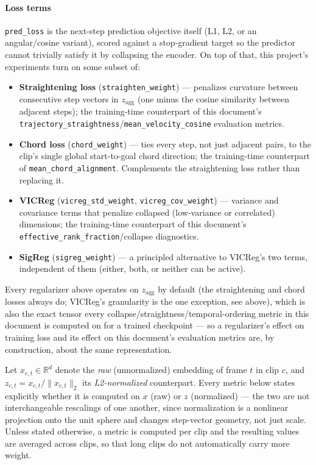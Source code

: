 \paragraph{Loss terms} \texttt{pred\_loss} is the next-step prediction objective itself
(L1, L2, or an angular/cosine variant), scored against a stop-gradient target so the
predictor cannot trivially satisfy it by collapsing the encoder. On top of that, this
project's experiments turn on some subset of:
\begin{itemize}
    \item \textbf{Straightening loss} (\texttt{straighten\_weight}) --- penalizes
    curvature between consecutive step vectors in $z_{\mathrm{agg}}$ (one minus the
    cosine similarity between adjacent steps); the training-time counterpart of this
    document's \texttt{trajectory\_straightness}/\texttt{mean\_velocity\_cosine}
    evaluation metrics.
    \item \textbf{Chord loss} (\texttt{chord\_weight}) --- ties every step, not just
    adjacent pairs, to the clip's single global start-to-goal chord direction; the
    training-time counterpart of \texttt{mean\_chord\_alignment}. Complements the
    straightening loss rather than replacing it.
    \item \textbf{VICReg} (\texttt{vicreg\_std\_weight}, \texttt{vicreg\_cov\_weight})
    --- variance and covariance terms that penalize collapsed (low-variance or
    correlated) dimensions; the training-time counterpart of this document's
    \texttt{effective\_rank\_fraction}/collapse diagnostics.
    \item \textbf{SigReg} (\texttt{sigreg\_weight}) --- a principled alternative to
    VICReg's two terms, independent of them (either, both, or neither can be active).
\end{itemize}
Every regularizer above operates on $z_{\mathrm{agg}}$ by default (the straightening and
chord losses always do; VICReg's granularity is the one exception, see above), which is
also the exact tensor every collapse/straightness/temporal-ordering metric in this
document is computed on for a trained checkpoint --- so a regularizer's effect on
training loss and its effect on this document's evaluation metrics are, by construction,
about the same representation.

Let $x_{c,t}\in\mathbb{R}^d$ denote the \emph{raw} (unnormalized) embedding of frame $t$
in clip $c$, and $z_{c,t}=x_{c,t}/\|x_{c,t}\|_2$ its \emph{L2-normalized} counterpart.
Every metric below states explicitly whether it is computed on $x$ (raw) or $z$
(normalized) --- the two are not interchangeable rescalings of one another, since
normalization is a nonlinear projection onto the unit sphere and changes step-vector
geometry, not just scale. Unless stated otherwise, a metric is computed per clip and the
resulting values are averaged across clips, so that long clips do not automatically carry
more weight.

